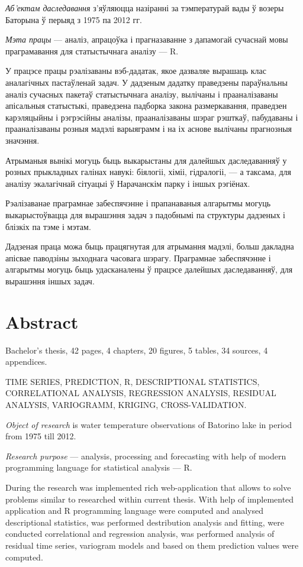\textit{Аб'ектам даследавання} з'яўляюцца назіранні за тэмпературай вады ў возеры Баторына ў перыяд з 1975 па 2012 гг.

\textit{Мэта працы} --- аналіз, апрацоўка і прагназаванне з дапамогай сучаснай мовы праграмавання для статыстычнага аналізу --- R.

У працэсе працы рэалізаваны вэб-дадатак, якое дазваляе вырашаць клас аналагічных пастаўленай задач. У дадзеным дадатку праведзены параўнальны аналіз сучасных пакетаў статыстычнага аналізу, вылічаны і прааналізаваны апісальныя статыстыкі, праведзена падборка закона размеркавання, праведзен карэляцыйны і рэгрэсійны аналізы, прааналізаваны шэраг рэшткаў, пабудаваны і прааналізаваны розныя мадэлі варыяграмм і на іх аснове вылічаны прагнозныя значэння.

Атрыманыя вынікі могуць быць выкарыстаны для далейшых даследаванняў у розных прыкладных галінах навукі: біялогіі, хіміі, гідралогіі, --- а таксама, для аналізу экалагічнай сітуацыі ў Нарачанскім парку і іншых рэгіёнах.

Рэалізаванае праграмнае забеспячэнне і прапанаваныя алгарытмы могуць выкарыстоўвацца для вырашэння задач з падобнымі па структуры дадзеных і блізкіх па тэме і мэтам.

Дадзеная праца можа быць працягнутая для атрымання мадэлі, больш дакладна апісвае паводзіны зыходнага часовага шэрагу. Праграмнае забеспячэнне і алгарытмы могуць быць удасканалены ў працэсе далейшых даследаванняў, для вырашэння іншых задач.

\newpage

\chapter*{Abstract}
Bachelor's thesis, 42 pages, 4 chapters, 20 figures, 5 tables, 34 sources, 4 appendices.

TIME SERIES, PREDICTION, R, DESCRIPTIONAL STATISTICS, CORRELATIONAL ANALYSIS, REGRESSION ANALYSIS, RESIDUAL ANALYSIS, VARIOGRAMM, KRIGING, CROSS-VALIDATION.

\textit{Object of research} is water temperature observations of Batorino lake in period from 1975 till 2012.

\textit{Research purpose} --- analysis, processing and forecasting with help of modern programming language for statistical analysis --- R.

During the research was implemented rich web-application that allows to solve problems similar to researched within current thesis. With help of implemented application and R programming language were computed and analysed descriptional statistics, was performed destribution analysis and fitting, were conducted correlational and regression analysis, was performed analysis of residual time series, variogram models and based on them prediction values were computed.

